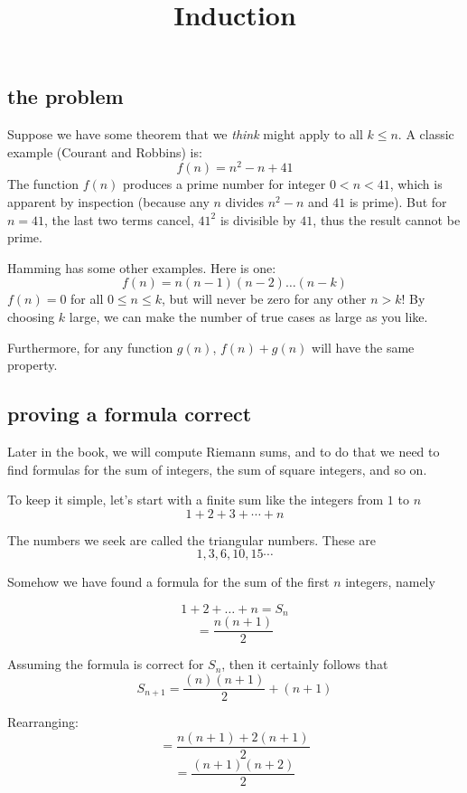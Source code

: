 \documentclass[11pt, oneside]{article}
\title{Induction}
\date{}
\begin{document}
\maketitle
\Large

\label{sec:Induction}

\subsection*{the problem}

Suppose we have some theorem that we \emph{think} might apply to all $k \le n$.  A classic example (Courant and Robbins) is:
\[ f(n) = n^2 - n + 41 \]
The function $f(n)$ produces a prime number for integer $0 < n < 41$, which is apparent by inspection (because any $n$ divides $n^2 - n$ and $41$ is prime).  But for $n=41$, the last two terms cancel, $41^2$ is divisible by $41$, thus the result cannot be prime.

Hamming has some other examples.  Here is one:
\[ f(n) = n(n-1)(n-2) \dots (n-k) \]
$f(n)=0$ for all $0 \le n \le k$, but will never be zero for any other $n > k$!  By choosing $k$ large, we can make the number of true cases as large as you like.

Furthermore, for any function $g(n)$, $f(n) + g(n)$ will have the same property.

\subsection*{proving a formula correct}

Later in the book, we will compute Riemann sums, and to do that we need to find formulas for the sum of integers, the sum of square integers, and so on.  

To keep it simple, let's start with a finite sum like the integers from $1$ to $n$
\[  1 + 2 + 3 + \cdots + n  \]

The numbers we seek are called the triangular numbers.  These are
\[ 1, 3, 6, 10, 15 \cdots \]

Somehow we have found a formula for the sum of the first $n$ integers, namely 

\[ 1 + 2 + \dots + n = S_n \]
\[ = \frac{n (n + 1)}{2} \]

Assuming the formula is correct for $S_n$, then it certainly follows that
\[ S_{n + 1} = \frac{(n)(n + 1)}{2} + (n+1) \]

Rearranging:
\[ = \frac{n(n + 1) + 2(n + 1)}{2} \]
\[ = \frac{(n + 1)(n + 2)}{2} \]
\end{document}
